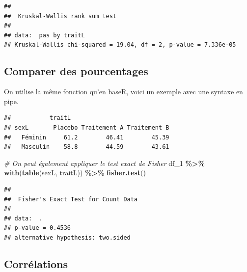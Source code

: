 \documentclass[
]{book}
\newenvironment{Shaded}{\begin{snugshade}}{\end{snugshade}}
\newcommand{\AttributeTok}[1]{\textcolor[rgb]{0.13,0.29,0.53}{#1}}
\newcommand{\CommentTok}[1]{\textcolor[rgb]{0.56,0.35,0.01}{\textit{#1}}}
\newcommand{\ConstantTok}[1]{\textcolor[rgb]{0.56,0.35,0.01}{#1}}
\newcommand{\FunctionTok}[1]{\textcolor[rgb]{0.13,0.29,0.53}{\textbf{#1}}}
\newcommand{\NormalTok}[1]{#1}
\newcommand{\OtherTok}[1]{\textcolor[rgb]{0.56,0.35,0.01}{#1}}
\newcommand{\SpecialCharTok}[1]{\textcolor[rgb]{0.81,0.36,0.00}{\textbf{#1}}}
\begin{document}
\begin{verbatim}
## 
##  Kruskal-Wallis rank sum test
## 
## data:  pas by traitL
## Kruskal-Wallis chi-squared = 19.04, df = 2, p-value = 7.336e-05
\end{verbatim}

\subsection{Comparer des pourcentages}\label{comparer-des-pourcentages-2}

On utilise la même fonction qu'en baseR, voici un exemple avec une syntaxe en pipe.

\begin{Shaded}
\end{Shaded}

\begin{verbatim}
##           traitL
## sexL       Placebo Traitement A Traitement B
##   Féminin     61.2        46.41        45.39
##   Masculin    58.8        44.59        43.61
\end{verbatim}

\begin{Shaded}
\begin{Highlighting}[]
\CommentTok{\# On peut également appliquer le test exact de Fisher}
\NormalTok{df\_1 }\SpecialCharTok{\%\textgreater{}\%} 
  \FunctionTok{with}\NormalTok{(}\FunctionTok{table}\NormalTok{(sexL, traitL)) }\SpecialCharTok{\%\textgreater{}\%}
  \FunctionTok{fisher.test}\NormalTok{()}
\end{Highlighting}
\end{Shaded}

\begin{verbatim}
## 
##  Fisher's Exact Test for Count Data
## 
## data:  .
## p-value = 0.4536
## alternative hypothesis: two.sided
\end{verbatim}

\subsection{Corrélations}\label{corruxe9lations-2}
\end{document}
